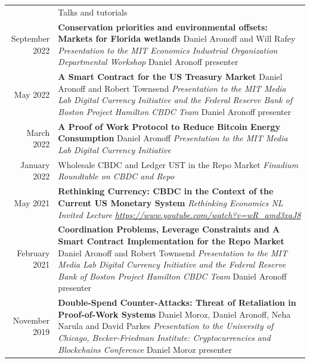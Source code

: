 \documentclass[letterpaper, 11pt]{article}
\newcommand{\headingfont}{\Large\color{OliveGreen}}
\newenvironment{SectionTable}[1]{
	\renewcommand*{\arraystretch}{1.7}
	\setlength{\tabcolsep}{10pt}
	\begin{longtable}{Rp{5.2in}} & #1 \\}
{\end{longtable}\vspace{-.3cm}}
\begin{document}
\begin{SectionTable}{\headingfont Talks and tutorials}
September 2022 &

\textbf{Conservation priorities and environmental offsets: Markets for Florida wetlands}\newline
Daniel Aronoff and Will Rafey \newline
\textit{Presentation to the MIT Economics Industrial Organization Departmental Workshop} \newline
Daniel Aronoff presenter\\

May 2022 &

\textbf{A Smart Contract for the US Treasury Market}\newline
Daniel Aronoff and Robert Townsend \newline
\textit{Presentation to the MIT Media Lab Digital Currency Initiative and the Federal Reserve Bank of Boston Project Hamilton CBDC Team}\newline
Daniel Aronoff presenter\\

March 2022 &

\textbf{A Proof of Work Protocol to Reduce Bitcoin Energy Consumption}\newline
Daniel Aronoff \newline
\textit{Presentation to the MIT Media Lab Digital Currency Initiative}\\


January 2022 &
Wholesale CBDC and Ledger UST in the Repo Market \newline
\textit{Finadium Roundtable on CBDC and Repo} \\

May 2021 &
\textbf{Rethinking Currency: CBDC in the Context of the Current US Monetary System} \newline
\textit{Rethinking Economics NL Invited Lecture\newline
\url{https://www.youtube.com/watch?v=wR_amd3xaJ8} } \\

February 2021 &
\textbf{Coordination Problems, Leverage Constraints and A Smart Contract Implementation for the Repo Market}  \newline
Daniel Aronoff and Robert Townsend \newline
\textit{Presentation to the MIT Media Lab Digital Currency Initiative and the Federal Reserve Bank of Boston Project Hamilton CBDC Team}\newline
Daniel Aronoff presenter\\


November 2019 &
\textbf{Double-Spend Counter-Attacks: Threat of Retaliation in Proof-of-Work Systems} \newline
Daniel Moroz, Daniel Aronoff, Neha Narula and David Parkes\newline
\textit{Presentation to the University of Chicago, Becker-Friedman Institute: Cryptocurrencies and Blockchains Conference} \newline
Daniel Moroz presenter\\

\end{SectionTable}
\end{document}
